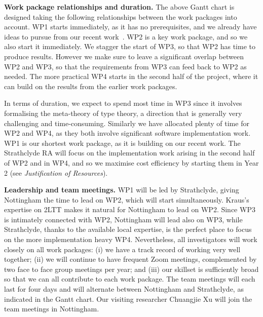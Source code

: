 \documentclass[a4paper,11pt]{article}
\let\oldcite\cite
\renewcommand*\cite[1]{{\protect\NoHyper\oldcite{#1}\protect\endNoHyper}}
\renewcommand{\paragraph}[1]{\textbf{#1.}}
\begin{document}
\vspace*{0.1in}
\paragraph{Work package relationships and duration}
%
The above Gantt chart is designed taking the following relationships
between the work packages into account.
%
WP1 starts immediately, as it has no prerequisites, and we already
have ideas to pursue from our recent
work~\cite{ordTCS,dejong-kra-nf-xu:set-type-ordinals}.
%
WP2 is a key work package, and so we also start it immediately.
%
We stagger the start of WP3, so that WP2 has time to produce results.
%
However we make sure to leave a significant overlap between WP2 and WP3,
so that the requirements from WP3 can feed back to WP2 as needed.
%
The more practical WP4 starts in the second half of the project, where
it can build on the results from the earlier work packages.


In terms of duration, we expect to spend most time in WP3 since it involves formalising the meta-theory of type theory, a direction that is generally very challenging and time-consuming.
%
Similarly we have allocated plenty of time for WP2 and WP4, as they
both involve significant software implementation work.
%
WP1 is our shortest work package, as it is building on our recent work.
%
The Strathclyde RA will focus on the implementation work arising in the second half of WP2 and in WP4, and so we maximise cost efficiency
by starting them in Year 2 (see \emph{Justification of Resources}).


\paragraph{Leadership and team meetings}
%
WP1 will be led by Strathclyde, giving Nottingham the time to lead on WP2, which will start simultaneously.
%
Kraus's expertise on 2LTT makes it natural for Nottingham to lead on WP2.
%
Since WP3 is intimately connected with WP2, Nottingham will lead also on WP3, while Strathclyde, thanks to the available local expertise, is the perfect place to focus on the more implementation heavy WP4.
%
Nevertheless, all investigators will work closely on all work packages:
(i) we have a track record of working very well together;
(ii) we will continue to have frequent Zoom meetings, complemented by two face to face group meetings per year; and
(iii) our skillset is sufficiently broad so that we can all contribute to each work package.
%
The team meetings will each last for four days and will alternate between Nottingham
and Strathclyde, as indicated in the Gantt chart.
%
Our visiting researcher Chuangjie Xu will join the team meetings in Nottingham.
\end{document}
